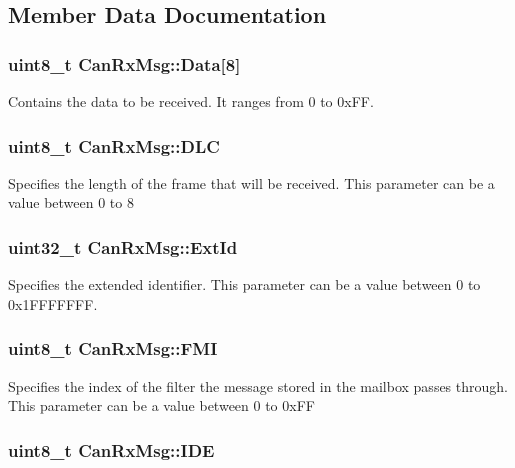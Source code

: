 \subsection{Member Data Documentation}
\hypertarget{structCanRxMsg_ae8ecbad16622db30d63fda08bc478649}{
\subsubsection[{Data}]{\setlength{\rightskip}{0pt plus 5cm}uint8\_\-t {\bf CanRxMsg::Data}\mbox{[}8\mbox{]}}}
\label{structCanRxMsg_ae8ecbad16622db30d63fda08bc478649}
Contains the data to be received. It ranges from 0 to 0xFF. \hypertarget{structCanRxMsg_abf77d3abf9ad290c08cdfd5d99ebc745}{
\subsubsection[{DLC}]{\setlength{\rightskip}{0pt plus 5cm}uint8\_\-t {\bf CanRxMsg::DLC}}}
\label{structCanRxMsg_abf77d3abf9ad290c08cdfd5d99ebc745}
Specifies the length of the frame that will be received. This parameter can be a value between 0 to 8 \hypertarget{structCanRxMsg_a1fdca10d31c81eea2ccef41d2aced562}{
\subsubsection[{ExtId}]{\setlength{\rightskip}{0pt plus 5cm}uint32\_\-t {\bf CanRxMsg::ExtId}}}
\label{structCanRxMsg_a1fdca10d31c81eea2ccef41d2aced562}
Specifies the extended identifier. This parameter can be a value between 0 to 0x1FFFFFFF. \hypertarget{structCanRxMsg_a5afe39d8e295659eeb3030593828b96a}{
\subsubsection[{FMI}]{\setlength{\rightskip}{0pt plus 5cm}uint8\_\-t {\bf CanRxMsg::FMI}}}
\label{structCanRxMsg_a5afe39d8e295659eeb3030593828b96a}
Specifies the index of the filter the message stored in the mailbox passes through. This parameter can be a value between 0 to 0xFF \hypertarget{structCanRxMsg_a83a67d1a709cc01570ce956e5adc811f}{
\subsubsection[{IDE}]{\setlength{\rightskip}{0pt plus 5cm}uint8\_\-t {\bf CanRxMsg::IDE}}}
